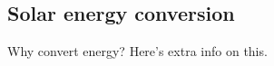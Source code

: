 
\subsection{Solar energy conversion}

\begin{frame}[t]{Why convert energy?}
Here's extra info on this.
\end{frame}

